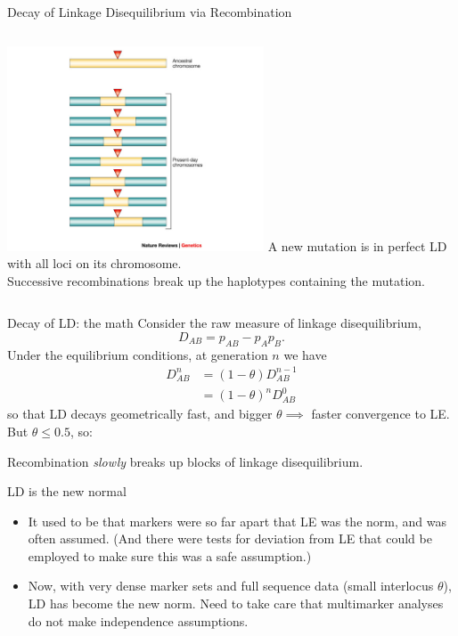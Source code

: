\documentclass[serif,mathserif,professionalfonts,svgnames]{beamer}
\begin{document}
\begin{frame}{Decay of Linkage Disequilibrium via Recombination}
  \begin{columns}[c]
    \column{2.5in}
    \includegraphics[width=3in]{ancestral-mutation.jpg}
    \column{2in}
    \small
    A new mutation is in perfect LD with all loci on its chromosome. \\[3cm]

    Successive recombinations break up the haplotypes containing the
    mutation. \\[2cm]
  \end{columns}
\end{frame}


\begin{frame}{Decay of LD: the math}
Consider the raw measure of linkage disequilibrium,
$$ D_{AB} = p_{AB}-p_A p_B . $$
Under the equilibrium conditions, at generation $n$ we have
\begin{align*}
  D_{AB}^n & = (1-\theta) D_{AB}^{n-1} \\[0.1cm]
          & = (1-\theta)^n D_{AB}^0 
\end{align*}
so that LD decays geometrically fast, and bigger $\theta
\implies$ faster convergence to LE.  But $\theta \leq 0.5$, so:

Recombination \emph{slowly} breaks up blocks of linkage disequilibrium.
\end{frame}




\begin{frame}{LD is the new normal}
  \begin{itemize}
  \item It used to be that markers were so far apart that LE was the
    norm, and was often assumed. (And there were tests for deviation
    from LE that could be employed to make sure this was a safe
    assumption.)
  \item Now, with very dense marker sets and full sequence data (small
    interlocus $\theta$), LD has become the new norm. Need to take
    care that multimarker analyses do not make independence
    assumptions.
 \end{itemize}
\end{frame}
\end{document}
